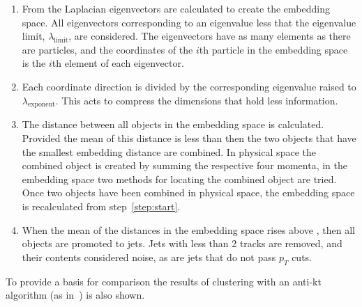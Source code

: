 \begin{enumerate}
\item \label{step:eigenvectors} From the Laplacian eigenvectors are calculated to create the embedding space.
            All eigenvectors corresponding to an eigenvalue less that the eigenvalue limit, \(\lambda_\text{limit}\), are considered.
        The eigenvectors have as many elements as there are particles, and the coordinates of
        the \(i\)th particle in the embedding space is the \(i\)th element of each eigenvector.

    \item \label{step:compression} Each coordinate direction is divided by the corresponding eigenvalue raised to \(\lambda_\text{exponent}\).
            This acts to compress the dimensions that hold less information.

        \item \label{step:stoppingcondition} The distance between all objects in the embedding space is calculated.
            Provided the mean of this distance is less than \stoppingdeltar{} then
        the two objects that have the smallest embedding distance are combined.
        In physical space the combined object is created by summing the respective four momenta,
        in the embedding space two methods for locating the combined object are tried.
        Once two objects have been combined in physical space, the embedding space is recalculated from step~\ref{step:start}. 


    \item When the mean of the distances in the embedding space rises above \stoppingdeltar{},
        then all objects are promoted to jets. Jets with less than 2 tracks are removed,
        and their contents considered noise,
        as are jets that do not pass \(p_T\) cuts.
    \end{enumerate}
    To provide a basis for comparison the results of clustering with an anti-kt algorithm (as in~\cite{Cacciari2008akt}) is also shown.

